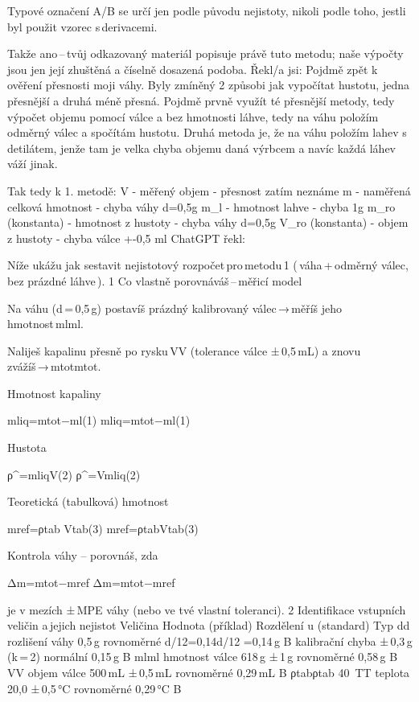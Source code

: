 {    Typové označení A/B se určí jen podle původu nejistoty, nikoli podle toho, jestli byl použit vzorec s derivacemi.

Takže ano – tvůj odkazovaný materiál popisuje právě tuto metodu; naše výpočty jsou jen její zhuštěná a číselně dosazená podoba.
Řekl/a jsi:
Pojdmě zpět k ověření přesnosti moji váhy. Byly zmíněný 2 způsobi jak vypočítat hustotu, jedna přesnější a druhá méně přesná. Pojdmě prvně využít té přesnější metody, tedy výpočet objemu pomocí válce a bez hmotnosti láhve, tedy na váhu položím odměrný válec a spočítám hustotu. Druhá metoda je, že na váhu položím lahev s detilátem, jenže tam je velka chyba objemu daná výrbcem a navíc každá láhev váží jinak. 

Tak tedy k 1. metodě:
V - měřený objem - přesnost zatím neznáme
m - naměřená celková hmotnost - chyba váhy d=0,5g
m_l - hmotnost lahve - chyba 1g
m_ro (konstanta) - hmotnost z hustoty - chyba váhy d=0,5g
V_ro (konstanta) - objem z hustoty - chyba válce +-0,5 ml
ChatGPT řekl:

Níže ukážu jak sestavit nejistotový rozpočet pro metodu 1
( váha + odměrný válec, bez prázdné láhve ).
1  Co vlastně porovnáváš – měřicí model

    Na váhu (d = 0,5 g) postavíš prázdný kalibrovaný válec → měříš jeho hmotnost mlml​.

    Naliješ kapalinu přesně po rysku VV (tolerance válce ± 0,5 mL) a znovu zvážíš → mtotmtot​.

    Hmotnost kapaliny

mliq=mtot−ml(1)
mliq​=mtot​−ml​(1)

    Hustota

ρ^=mliqV(2)
ρ^​=Vmliq​​(2)

    Teoretická (tabulková) hmotnost

mref=ρtab  Vtab(3)
mref​=ρtab​Vtab​(3)

    Kontrola váhy – porovnáš, zda

Δm=mtot−mref
Δm=mtot​−mref​

je v mezích ± MPE váhy (nebo ve tvé vlastní toleranci).
2  Identifikace vstupních veličin a jejich nejistot
Veličina	Hodnota (příklad)	Rozdělení	u (standard)	Typ
dd rozlišení váhy	0,5 g	rovnoměrné	d/12=0,14d/12
​=0,14 g	B
kalibrační chyba	± 0,3 g (k = 2)	normální	0,15 g	B
mlml​ hmotnost válce	618 g ± 1 g	rovnoměrné	0,58 g	B
VV objem válce	500 mL ± 0,5 mL	rovnoměrné	0,29 mL	B
ρtabρtab​ 40 %
TT teplota	20,0 ± 0,5 °C	rovnoměrné	0,29 °C	B

}
